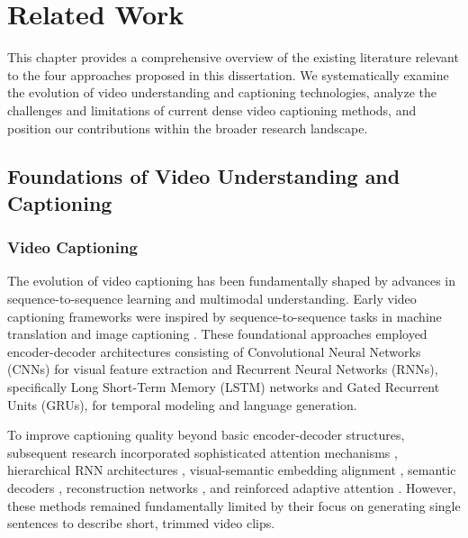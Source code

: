 
\chapter{Related Work}
\label{chap:related_work}

This chapter provides a comprehensive overview of the existing literature relevant to the four approaches proposed in this dissertation. We systematically examine the evolution of video understanding and captioning technologies, analyze the challenges and limitations of current dense video captioning methods, and position our contributions within the broader research landscape.

\section{Foundations of Video Understanding and Captioning}
\label{sec:foundations}

\subsection{Video Captioning}
The evolution of video captioning has been fundamentally shaped by advances in sequence-to-sequence learning and multimodal understanding.
Early video captioning frameworks \cite{venugopalan2015sequence,venugopalan2015translating} were inspired by sequence-to-sequence tasks in machine translation \cite{sutskever2014sequence,cho-etal-2014-learning} and image captioning \cite{vinyals2015show,ren2017deep}.
These foundational approaches employed encoder-decoder architectures consisting of Convolutional Neural Networks (CNNs) for visual feature extraction and Recurrent Neural Networks (RNNs), specifically Long Short-Term Memory (LSTM) networks and Gated Recurrent Units (GRUs), for temporal modeling and language generation.

To improve captioning quality beyond basic encoder-decoder structures, subsequent research incorporated sophisticated attention mechanisms \cite{yao2015describing}, hierarchical RNN architectures \cite{pan2016hierarchical,baraldi2017hierarchical}, visual-semantic embedding alignment \cite{pan2016jointly}, semantic decoders \cite{gan2017semantic,pan2017video}, reconstruction networks \cite{wang2018reconstruction}, and reinforced adaptive attention \cite{xiao2019video}.
However, these methods remained fundamentally limited by their focus on generating single sentences to describe short, trimmed video clips.

